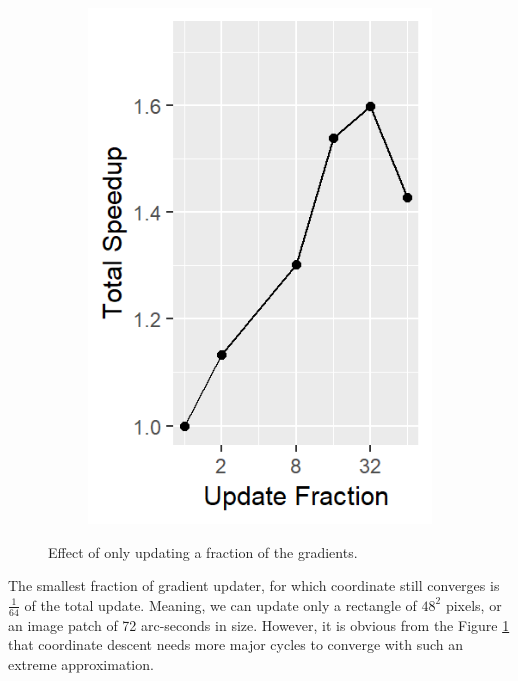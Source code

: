 \begin{figure}[h]
\begin{subfigure}[b]{0.195\linewidth}
	\end{subfigure}
	\begin{subfigure}[b]{0.195\linewidth}
		\includegraphics[width=\linewidth]{./chapters/10.results/gradient/ApproxUpdate/speedup_total.png}
	\end{subfigure}
	
	\caption{Effect of only updating a fraction of the gradients.}
	\label{results:gradients:update}
\end{figure}

The smallest fraction of gradient updater, for which coordinate still converges is $\frac{1}{64}$ of the total update. Meaning, we can update only a rectangle of $48^2$ pixels, or an image patch of 72 arc-seconds in size. However, it is obvious from the Figure \ref{results:gradients:update} that coordinate descent needs more major cycles to converge with such an extreme approximation.

